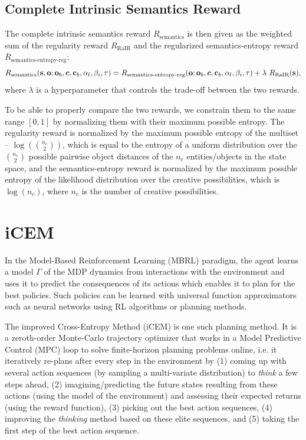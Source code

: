 \subsection{Complete Intrinsic Semantics Reward}
\label{sec:complete-semantics-reward}
The complete intrinsic semantics reward \(R_{\text{semantics}}\) is then given as the weighted sum of the regularity reward \(R_{\text{RaIR}}\) and the regularized semantics-entropy reward \(R_{\text{semantics-entropy-reg}}\);
\begin{equation}
    \label{eq:semantics-reward}
    R_{\text{semantics}}(\bfs, \bfo; \bfo_b, \bmc, \bfc_b, \alpha_{l}, \beta_{i}, \tau) =R_{\text{semantics-entropy-reg}}(\bfo; \bfo_b, \bmc, \bfc_b, \alpha_{l}, \beta_{i}, \tau) + \lambda\ R_{\text{RaIR}}(\bfs),
\end{equation}
where \(\lambda\) is a hyperparameter that controls the trade-off between the two rewards.

To be able to properly compare the two rewards, we constrain them to the same range \([0, 1]\) by normalizing them with their maximum possible entropy.
The regularity reward is normalized by the maximum possible entropy of the multiset -- \(\log\left(\binom{n_e}{2}\right)\), which is equal to the entropy of a uniform distribution over the \(\binom{n_e}{2}\) possible pairwise object distances of the \(n_e\) entities/objects in the state space, and
the semantics-entropy reward is normalized by the maximum possible entropy of the likelihood distribution over the creative possibilities, which is \(\log(n_c)\), where \(n_c\) is the number of creative possibilities.

\newpage
\section{iCEM}
\label{sec:icem}

In the Model-Based Reinforcement Learning (MBRL) paradigm, the agent learns a model \(\Gamma\) of the MDP dynamics from interactions with the environment and uses it to predict the consequences of its actions which enables it to plan for the best policies.
Such policies can be learned with universal function approximators such as neural networks using RL algorithms or planning methods.

The improved Cross-Entropy Method (iCEM) is one such planning method.
It is a zeroth-order Monte-Carlo trajectory optimizer that works in a Model Predictive Control (MPC) loop to solve finite-horizon planning problems online, i.e. it iteratively re-plans after every step in the environment by (1) coming up with several action sequences (by sampling a multi-variate distribution) to \emph{think} a few steps ahead, (2) imagining/predicting the future states resulting from these actions (using the model of the environment) and assessing their expected returns (using the reward function), (3) picking out the best action sequences, (4) improving the \emph{thinking} method based on these elite sequences, and (5) taking the first step of the best action sequence.

